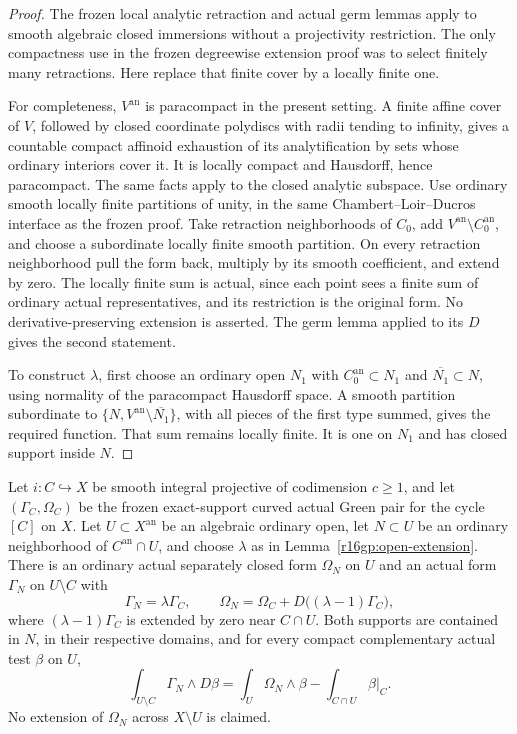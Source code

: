 \begin{proof}
The frozen local analytic retraction and actual germ lemmas apply
to smooth algebraic closed immersions without a projectivity
restriction.  The only compactness use in the frozen degreewise
extension proof was to select finitely many retractions.  Here
replace that finite cover by a locally finite one.

For completeness, $V^{\mathrm{an}}$ is paracompact in the present
setting.  A finite affine cover of $V$, followed by closed coordinate
polydiscs with radii tending to infinity, gives a countable compact
affinoid exhaustion of its analytification by sets whose ordinary
interiors cover it.  It is locally compact and Hausdorff, hence
paracompact.  The same facts apply to the closed analytic subspace.
Use ordinary smooth locally finite partitions of unity, in the
same Chambert--Loir--Ducros interface as the frozen proof.
Take retraction neighborhoods of $C_0$, add $V^{\mathrm{an}}\setminus
C_0^{\mathrm{an}}$, and choose a subordinate locally finite smooth
partition.  On every retraction neighborhood pull the form back,
multiply by its smooth coefficient, and extend by zero.  The
locally finite sum is actual, since each point sees a finite sum
of ordinary actual representatives, and its restriction is the
original form.  No derivative-preserving extension is asserted.
The germ lemma applied to its $D$ gives the second statement.

To construct $\lambda$, first choose an ordinary open $N_1$ with
$C_0^{\mathrm{an}}\subset N_1$ and $\overline{N_1}\subset N$,
using normality of the paracompact Hausdorff space.  A smooth
partition subordinate to $\{N,V^{\mathrm{an}}\setminus
\overline{N_1}\}$, with all pieces of the first type summed,
gives the required function.  That sum remains locally finite.
It is one on $N_1$ and has closed support inside $N$.
\end{proof}

\begin{lemma}
\label{r16gp:localized-pair}
Let $i:C\hookrightarrow X$ be smooth integral projective of
codimension $c\geq1$, and let $(\Gamma_C,\Omega_C)$ be the frozen
exact-support curved actual Green pair for the cycle $[C]$ on $X$.
Let $U\subset X^{\mathrm{an}}$ be an algebraic ordinary open,
let $N\subset U$ be an ordinary neighborhood of $C^{\mathrm{an}}\cap U$,
and choose $\lambda$ as in Lemma~\ref{r16gp:open-extension}.
There is an ordinary actual separately closed form $\Omega_N$ on
$U$ and an actual form $\Gamma_N$ on $U\setminus C$ with
\[
 \Gamma_N=\lambda\Gamma_C,\qquad
 \Omega_N=\Omega_C+D\bigl((\lambda-1)\Gamma_C\bigr),
 \tag{GP16.1}\label{r16gp:local-pair}
\]
where $(\lambda-1)\Gamma_C$ is extended by zero near $C\cap U$.
Both supports are contained in $N$, in their respective domains,
and for every compact complementary actual test $\beta$ on $U$,
\[
 \int_{U\setminus C}\Gamma_N\wedge D\beta
   =\int_U\Omega_N\wedge\beta
                       -\int_{C\cap U}\beta|_C.
 \tag{GP16.2}\label{r16gp:local-green}
\]
No extension of $\Omega_N$ across $X\setminus U$ is claimed.
\end{lemma}

